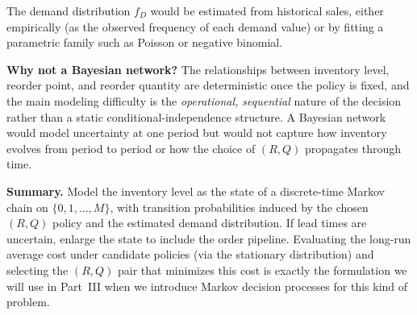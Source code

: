 \documentclass[12pt]{article}
\begin{document}
The demand distribution $f_D$ would be estimated from historical sales, either empirically (as the observed frequency of each demand value) or by fitting a parametric family such as Poisson or negative binomial.

\textbf{Why not a Bayesian network?} The relationships between inventory level, reorder point, and reorder quantity are deterministic once the policy is fixed, and the main modeling difficulty is the \emph{operational, sequential} nature of the decision rather than a static conditional-independence structure. A Bayesian network would model uncertainty at one period but would not capture how inventory evolves from period to period or how the choice of $(R, Q)$ propagates through time.

\textbf{Summary.} Model the inventory level as the state of a discrete-time Markov chain on $\{0, 1, \dots, M\}$, with transition probabilities induced by the chosen $(R, Q)$ policy and the estimated demand distribution. If lead times are uncertain, enlarge the state to include the order pipeline. Evaluating the long-run average cost under candidate policies (via the stationary distribution) and selecting the $(R, Q)$ pair that minimizes this cost is exactly the formulation we will use in Part~III when we introduce Markov decision processes for this kind of problem.
\end{document}
